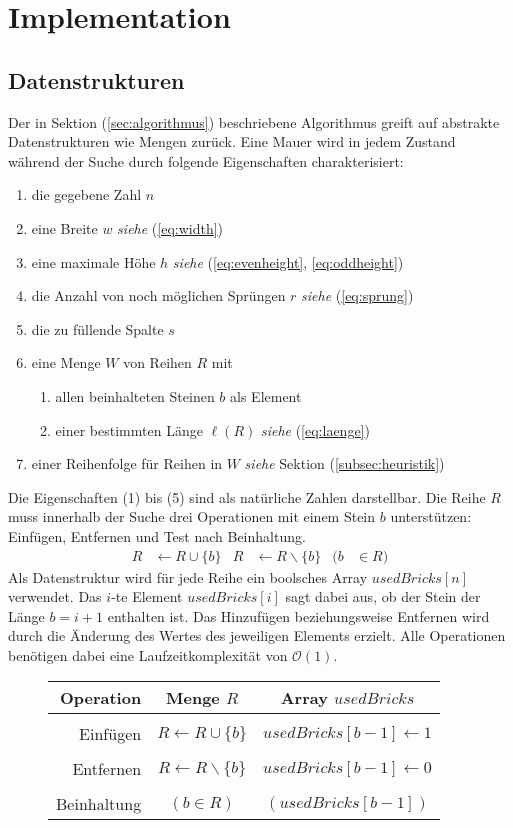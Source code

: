 \documentclass[a4paper, 12pt]{scrartcl}
\newcommand{\see}[1]{\hfill\emph{siehe} (\ref{#1})}
\begin{document}
\section{Implementation}
\subsection{Datenstrukturen}
Der in Sektion (\ref{sec:algorithmus}) beschriebene Algorithmus greift auf abstrakte Datenstrukturen wie Mengen zurück. Eine Mauer wird in jedem Zustand während der Suche durch folgende Eigenschaften charakterisiert:
\begin{enumerate}
	\itemsep-2pt
	\item die gegebene Zahl $n$
	\item eine Breite $w$ \see{eq:width}
	\item eine maximale Höhe $h$ \hfill \emph{siehe} (\ref{eq:evenheight}, \ref{eq:oddheight})
	\item die Anzahl von noch möglichen Sprüngen $r$ \see{eq:sprung}
	\item die zu füllende Spalte $s$
	\item eine Menge $W$ von Reihen $R$ mit
	\begin{enumerate}
		\item allen beinhalteten Steinen $b$ als Element
		\item einer bestimmten Länge $\ell(R)$ \see{eq:laenge}
	\end{enumerate}
	\item einer Reihenfolge für Reihen in $W$  \emph{siehe} Sektion (\ref{subsec:heuristik})
\end{enumerate}
Die Eigenschaften (1) bis (5) sind als natürliche Zahlen darstellbar. Die Reihe $R$ muss innerhalb der Suche drei Operationen mit einem Stein $b$ unterstützen: Einfügen, Entfernen und Test nach Beinhaltung.
\begin{align*}
 	R &\leftarrow R\cup\{b\} & R &\leftarrow R\backslash\{b\} & (b &\in R)
\end{align*}
Als Datenstruktur wird für jede Reihe ein boolsches Array $usedBricks[n]$ verwendet. Das $i$-te Element $usedBricks[i]$ sagt dabei aus, ob der Stein der Länge $b=i+1$ enthalten ist. Das Hinzufügen beziehungsweise Entfernen wird durch die Änderung des Wertes des jeweiligen Elements erzielt. Alle Operationen benötigen dabei eine Laufzeitkomplexität von $\mathcal{O}(1)$.
\begin{figure}[H]
	\centering
	\begin{tabular}{rcc}
		Operation & \hspace{1cm} Menge $R$ \hspace{1cm} & Array $usedBricks$ \\
		\hline\\
		Einfügen & $R \leftarrow R\cup\{b\}$ & $usedBricks[b-1] \leftarrow 1$ \\\\
		Entfernen & $R \leftarrow R\backslash\{b\}$ & $usedBricks[b-1] \leftarrow 0$ \\\\
		Beinhaltung & $(b \in R)$ & $(usedBricks[b-1])$
	\end{tabular}
\end{figure}
\end{document}
